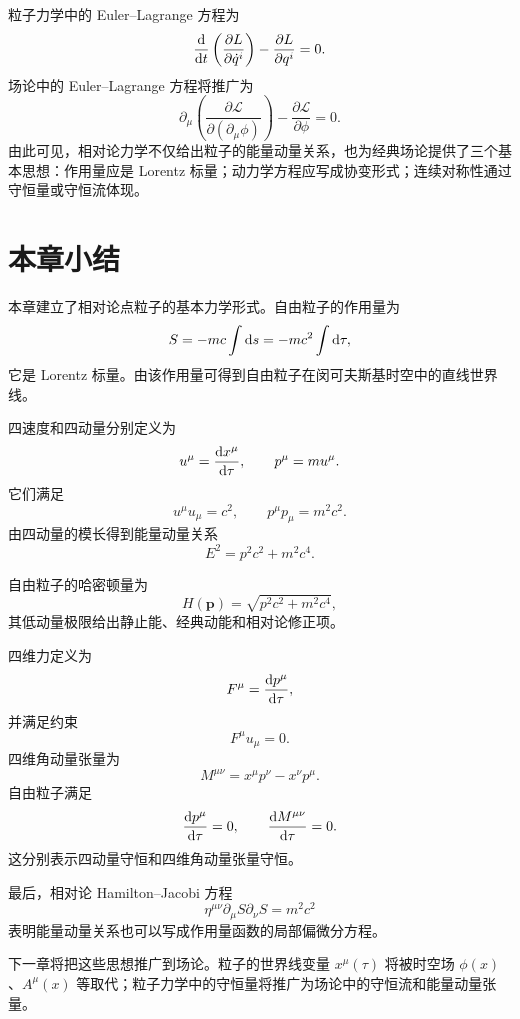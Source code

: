 粒子力学中的 Euler--Lagrange 方程为
\[
\frac{\mathop{}\!\mathrm{d}}{\mathop{}\!\mathrm{d} t}
\left(
\frac{\partial L}{\partial \dot q^{i}}
\right)
-
\frac{\partial L}{\partial q^{i}}
=0.
\]
场论中的 Euler--Lagrange 方程将推广为
\[
\partial_{\mu}
\left(
\frac{\partial\mathcal{L}}{\partial(\partial_{\mu}\phi)}
\right)
-
\frac{\partial\mathcal{L}}{\partial\phi}
=0.
\]
由此可见，相对论力学不仅给出粒子的能量动量关系，也为经典场论提供了三个基本思想：作用量应是 Lorentz 标量；动力学方程应写成协变形式；连续对称性通过守恒量或守恒流体现。

\section{本章小结}

本章建立了相对论点粒子的基本力学形式。自由粒子的作用量为
\[
S=-mc\int \mathop{}\!\mathrm{d} s=-mc^{2}\int \mathop{}\!\mathrm{d}\tau,
\]
它是 Lorentz 标量。由该作用量可得到自由粒子在闵可夫斯基时空中的直线世界线。

四速度和四动量分别定义为
\[
u^{\mu}=\frac{\mathop{}\!\mathrm{d} x^{\mu}}{\mathop{}\!\mathrm{d}\tau},
\qquad
p^{\mu}=mu^{\mu}.
\]
它们满足
\[
u^{\mu}u_{\mu}=c^{2},
\qquad
p^{\mu}p_{\mu}=m^{2}c^{2}.
\]
由四动量的模长得到能量动量关系
\[
E^{2}=p^{2}c^{2}+m^{2}c^{4}.
\]

自由粒子的哈密顿量为
\[
H(\bm{p})=\sqrt{p^{2}c^{2}+m^{2}c^{4}},
\]
其低动量极限给出静止能、经典动能和相对论修正项。

四维力定义为
\[
F^{\mu}=\frac{\mathop{}\!\mathrm{d} p^{\mu}}{\mathop{}\!\mathrm{d}\tau},
\]
并满足约束
\[
F^{\mu}u_{\mu}=0.
\]
四维角动量张量为
\[
M^{\mu\nu}=x^{\mu}p^{\nu}-x^{\nu}p^{\mu}.
\]
自由粒子满足
\[
\frac{\mathop{}\!\mathrm{d} p^{\mu}}{\mathop{}\!\mathrm{d}\tau}=0,
\qquad
\frac{\mathop{}\!\mathrm{d} M^{\mu\nu}}{\mathop{}\!\mathrm{d}\tau}=0.
\]
这分别表示四动量守恒和四维角动量张量守恒。

最后，相对论 Hamilton--Jacobi 方程
\[
\eta^{\mu\nu}\partial_{\mu}S\partial_{\nu}S=m^{2}c^{2}
\]
表明能量动量关系也可以写成作用量函数的局部偏微分方程。

下一章将把这些思想推广到场论。粒子的世界线变量 $x^{\mu}(\tau)$ 将被时空场 $\phi(x)$、$A^{\mu}(x)$ 等取代；粒子力学中的守恒量将推广为场论中的守恒流和能量动量张量。

